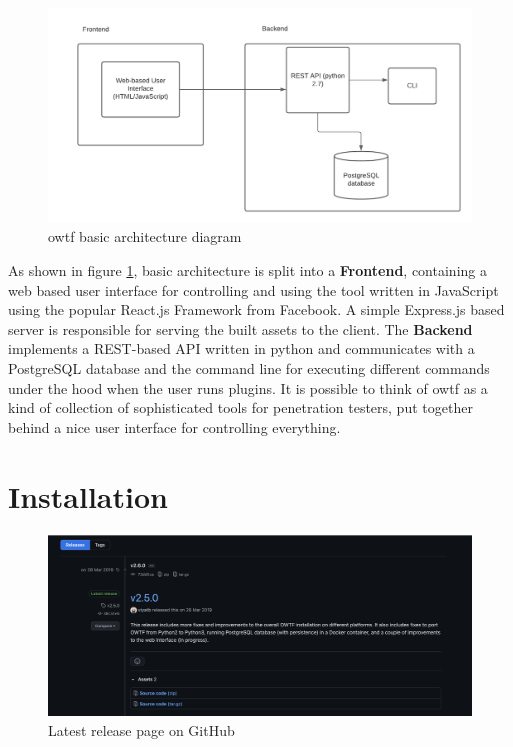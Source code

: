 \begin{figure}[H]
	\centering
	\includegraphics[width=12cm,keepaspectratio=true]{pictures/architecture.png}
	\caption{
		\ac{owtf} basic architecture diagram
	}
	\label{fig:architecture}
\end{figure}

As shown in figure \ref{fig:architecture}, basic architecture is split into a \textbf{Frontend}, containing a web based user interface for controlling and using the tool written in JavaScript using the popular React.js Framework from Facebook. A simple Express.js based server is responsible for serving the built assets to the client. The \textbf{Backend} implements a REST-based API written in python and communicates with a PostgreSQL database and the command line for executing different commands under the hood when the user runs plugins. 
It is possible to think of \ac{owtf} as a kind of collection of sophisticated tools for penetration testers, put together behind a nice user interface for controlling everything.


\section{Installation}

\begin{figure}[H]
	\centering
	\includegraphics[width=12cm,keepaspectratio=true]{pictures/lastest-release.png}
	\caption{
		Latest release page on GitHub
	}
	\label{fig:lastest-release}
\end{figure}

